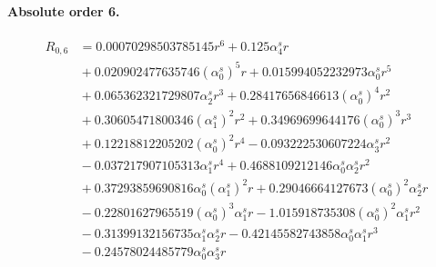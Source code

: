 \documentclass[10pt]{article}
\begin{document}
\paragraph{Absolute order 6.}
\begin{align*}
R_{0,6} &= 0.00070298503785145 r^{6} + 0.125 \alpha_{4}^s r \\
&{}  + 0.020902477635746 \left(\alpha_{0}^s\right)^{5} r + 0.015994052232973 \alpha_{0}^s r^{5} \\
&{}  + 0.065362321729807 \alpha_{2}^s r^{3} + 0.28417656846613 \left(\alpha_{0}^s\right)^{4} r^{2} \\
&{}  + 0.30605471800346 \left(\alpha_{1}^s\right)^{2} r^{2} + 0.34969699644176 \left(\alpha_{0}^s\right)^{3} r^{3} \\
&{}  + 0.12218812205202 \left(\alpha_{0}^s\right)^{2} r^{4} - 0.093222530607224 \alpha_{3}^s r^{2} \\
&{}  - 0.037217907105313 \alpha_{1}^s r^{4} + 0.4688109212146 \alpha_{0}^s \alpha_{2}^s r^{2} \\
&{}  + 0.37293859690816 \alpha_{0}^s \left(\alpha_{1}^s\right)^{2} r + 0.29046664127673 \left(\alpha_{0}^s\right)^{2} \alpha_{2}^s r \\
&{}  - 0.22801627965519 \left(\alpha_{0}^s\right)^{3} \alpha_{1}^s r - 1.015918735308 \left(\alpha_{0}^s\right)^{2} \alpha_{1}^s r^{2} \\
&{}  - 0.31399132156735 \alpha_{1}^s \alpha_{2}^s r - 0.42145582743858 \alpha_{0}^s \alpha_{1}^s r^{3} \\
&{}  - 0.24578024485779 \alpha_{0}^s \alpha_{3}^s r
\end{align*}
\end{document}
